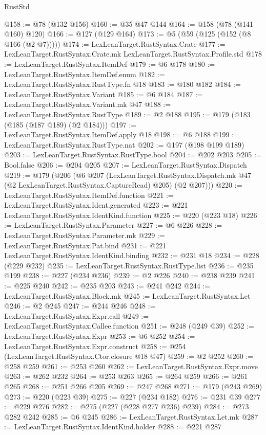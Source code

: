 \begin{lexlean}{RustStd}
\begin{coremodule}
@158 := @78 (@132 @156)
@160 := @35 @47 @144
@164 := @158 (@78 (@141 @160) @120)
@166 := @127 (@129 @164)
@173 := @5 (@59 (@125 (@152 (@8 @166 (@2 @7)))))
@174 := LexLeanTarget.RustSyntax.Crate
@177 := LexLeanTarget.RustSyntax.Crate.mk LexLeanTarget.RustSyntax.Profile.std
@178 := LexLeanTarget.RustSyntax.ItemDef
@179 := @6 @178
@180 := LexLeanTarget.RustSyntax.ItemDef.enum
@182 := LexLeanTarget.RustSyntax.RustType.fn @18
@183 := @180 @182
@184 := LexLeanTarget.RustSyntax.Variant
@185 := @6 @184
@187 := LexLeanTarget.RustSyntax.Variant.mk @47
@188 := LexLeanTarget.RustSyntax.RustType
@189 := @2 @188
@195 := @179 (@183 (@185 (@187 @189) (@2 @184)))
@197 := LexLeanTarget.RustSyntax.ItemDef.apply @18
@198 := @6 @188
@199 := LexLeanTarget.RustSyntax.RustType.nat
@202 := @197 (@198 @199 @189)
@203 := LexLeanTarget.RustSyntax.RustType.bool
@204 := @202 @203
@205 := Bool.false
@206 := @204 @205
@207 := LexLeanTarget.RustSyntax.Dispatch
@219 := @179
    (@206
      (@6
        @207
        (LexLeanTarget.RustSyntax.Dispatch.mk @47 (@2 LexLeanTarget.RustSyntax.CaptureRead) @205)
        (@2 @207)))
@220 := LexLeanTarget.RustSyntax.ItemDef.function
@221 := LexLeanTarget.RustSyntax.Ident.generated
@223 := @221 LexLeanTarget.RustSyntax.IdentKind.function
@225 := @220 (@223 @18)
@226 := LexLeanTarget.RustSyntax.Parameter
@227 := @6 @226
@228 := LexLeanTarget.RustSyntax.Parameter.mk
@229 := LexLeanTarget.RustSyntax.Pat.bind
@231 := @221 LexLeanTarget.RustSyntax.IdentKind.binding
@232 := @231 @18
@234 := @228 (@229 @232)
@235 := LexLeanTarget.RustSyntax.RustType.list
@236 := @235 @199
@238 := @227 (@234 @236)
@239 := @2 @226
@240 := @238 @239
@241 := @225 @240
@242 := @235 @203
@243 := @241 @242
@244 := LexLeanTarget.RustSyntax.Block.mk
@245 := LexLeanTarget.RustSyntax.Let
@246 := @2 @245
@247 := @244 @246
@248 := LexLeanTarget.RustSyntax.Expr.call
@249 := LexLeanTarget.RustSyntax.Callee.function
@251 := @248 (@249 @39)
@252 := LexLeanTarget.RustSyntax.Expr
@253 := @6 @252
@254 := LexLeanTarget.RustSyntax.Expr.construct
@258 := @254 (LexLeanTarget.RustSyntax.Ctor.closure @18 @47)
@259 := @2 @252
@260 := @258 @259
@261 := @253 @260
@262 := LexLeanTarget.RustSyntax.Expr.move
@263 := @262 @232
@264 := @253 @263
@265 := @264 @259
@266 := @261 @265
@268 := @251 @266 @205
@269 := @247 @268
@271 := @179 (@243 @269)
@273 := @220 (@223 @39)
@275 := @227 (@234 @182)
@276 := @231 @39
@277 := @229 @276
@282 := @275 (@227 (@228 @277 @236) @239)
@284 := @273 @282 @242
@285 := @6 @245
@286 := LexLeanTarget.RustSyntax.Let.mk
@287 := LexLeanTarget.RustSyntax.IdentKind.holder
@288 := @221 @287

\end{coremodule}
\end{lexlean}
